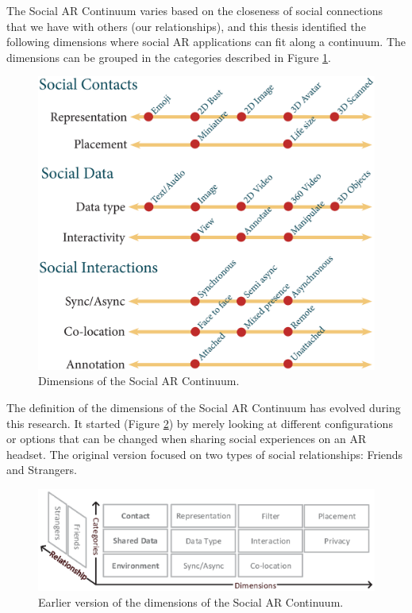 The Social AR Continuum varies based on the closeness of social connections that we have with others (our relationships), and this thesis identified the following dimensions where social AR applications can fit along a continuum. The dimensions can be grouped in the categories described in Figure \ref{fig:continuum:dimensions}.

\begin{figure}[ht]
    \centering
    \includegraphics[width=\linewidth]{images/30-continuum/continuum43-01.eps}
    \caption{Dimensions of the Social AR Continuum.}
    \label{fig:continuum:dimensions}
\end{figure}

The definition of the dimensions of the Social AR Continuum has evolved during this research. It started (Figure \ref{fig:continuum:old-dimensions}) by merely looking at different configurations or options that can be changed when sharing social experiences on an AR headset. The original version focused on two types of social relationships: Friends and Strangers.

\begin{figure}[ht]
    \centering
    \includegraphics[width=\linewidth]{images/30-continuum/original-dimensions-diagram.eps}
    \caption{Earlier version of the dimensions of the Social AR Continuum.}
    \label{fig:continuum:old-dimensions}
\end{figure}

